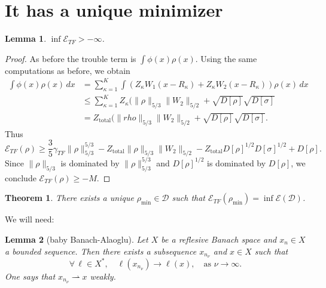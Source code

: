 \documentclass[11pt]{amsart}
\newtheorem{thm}{Theorem}
\newtheorem{lem}{Lemma}
\theoremstyle{definition}
\theoremstyle{definition}
\theoremstyle{definition}
\numberwithin{equation}{section}
\begin{document}
\section{It has a unique minimizer} 
\begin{lem}
$\inf\mathcal{E}_{TF}>-\infty$.
\end{lem}
\begin{proof}
As before the trouble term is $\int \phi(x)\rho(x)$. Using the same computations as before, we obtain
\begin{align*}
\int \phi(x)\rho(x)\,dx&=\sum_{\kappa=1}^{K}\int(Z_\kappa W_1(x-R_\kappa)+Z_\kappa W_2(x-R_\kappa))\rho(x)\,dx\\
&\le\sum_{\kappa=1}^K Z_\kappa(\|\rho\|_{5/3}\|W_2\|_{5/2}+\sqrt{D[\rho]}\sqrt{D[\sigma]}\\
&=Z_\text{total}(\|rho\|_{5/3}\|W_2\|_{5/2}+\sqrt{D[\rho]}\sqrt{D[\sigma]}.
\end{align*}
Thus
\begin{equation}\label{eqn:ETF-lower-bound}
\mathcal{E}_{TF}(\rho)\ge\frac{3}{5}\gamma_{TF}\|\rho\|_{5/3}^{5/3}-Z_\text{total}\|\rho\|_{5/3}\|W_2\|_{5/2}-Z_\text{total}D[\rho]^{1/2}D[\sigma]^{1/2}+D[\rho].
\end{equation}
Since $\|\rho\|_{5/3}$ is dominated by $\|\rho\|_{5/3}^{5/3}$ and $D[\rho]^{1/2}$ is dominated by $D[\rho]$, we conclude $\mathcal{E}_{TF}(\rho)\ge-M$.
\end{proof}

\begin{thm}
There exists a unique $\rho_\mathrm{min}\in\mathcal{D}$ such that $\mathcal{E}_{TF}(\rho_\mathrm{min})=\inf\mathcal{E}(\mathcal{D})$.
\end{thm}

We will need:
\begin{lem}[baby Banach-Alaoglu]
Let $X$ be a reflesive Banach space and $x_n\in X$ a bounded sequence. Then there exists a subsequence $x_{n_\nu}$ and $x\in X$ such that
\[
\forall\,\ell\in X^*,\quad \ell(x_{n_\nu})\to \ell(x),\quad\text{as }\nu\to\infty.
\]
One says that $x_{n_\nu}\rightharpoonup x$ \emph{weakly}.
\end{lem}
\end{document}
